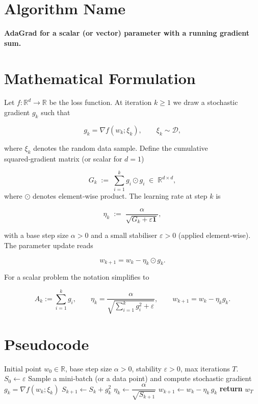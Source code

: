 \documentclass{article}
\begin{document}
\section*{Algorithm Name}
\textbf{AdaGrad for a scalar (or vector) parameter with a running gradient sum.}

\section*{Mathematical Formulation}
Let $f:\mathbb{R}^{d}\to\mathbb{R}$ be the loss function.  
At iteration $k\ge 1$ we draw a stochastic gradient $g_k$ such that  

\[
g_k = \nabla f(w_k; \xi_k),\qquad \xi_k\sim\mathcal{D},
\]

where $\xi_k$ denotes the random data sample.  
Define the cumulative squared‑gradient matrix (or scalar for $d=1$)

\[
G_k \;:=\; \sum_{i=1}^{k} g_i\odot g_i \;\in\;\mathbb{R}^{d\times d},
\]
where $\odot$ denotes element‑wise product.  
The learning rate at step $k$ is

\[
\eta_k \;:=\; \frac{\alpha}{\sqrt{G_k+\varepsilon\mathbf 1}},
\tag{1}
\]

with a base step size $\alpha>0$ and a small stabiliser $\varepsilon>0$ (applied element‑wise).  
The parameter update reads

\[
w_{k+1}= w_k - \eta_k\odot g_k .
\tag{2}
\]

For a scalar problem the notation simplifies to  

\[
A_k:=\sum_{i=1}^{k} g_i ,\qquad 
\eta_k = \frac{\alpha}{\sqrt{\sum_{i=1}^{k} g_i^{2}+\varepsilon}},\qquad 
w_{k+1}= w_k- \eta_k g_k .
\tag{3}
\]

\section*{Pseudocode}
\begin{algorithm}[H]
\caption{AdaGrad (scalar version)}
\begin{algorithmic}[1]
\Require Initial point $w_0\in\mathbb{R}$, base step size $\alpha>0$, stability $\varepsilon>0$, max iterations $T$.
\State $S_0 \gets \varepsilon$ 
    \State Sample a mini‑batch (or a data point) and compute stochastic gradient $g_k = \nabla f(w_k;\xi_k)$
    \State $S_{k+1} \gets S_k + g_k^{2}$ 
    \State $\eta_k \gets \dfrac{\alpha}{\sqrt{S_{k+1}}}$
    \State $w_{k+1} \gets w_k - \eta_k\, g_k$
\EndFor
\State \textbf{return} $w_T$
\end{algorithmic}
\end{algorithm}
\end{document}
